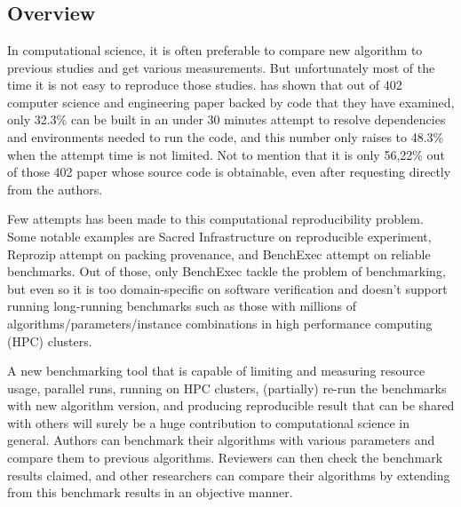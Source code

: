 \chapter{\babSatu}


\section{Overview}

In computational science, it is often preferable to compare new algorithm to previous studies and get various measurements. But unfortunately most of the time it is not easy to reproduce those studies. \cite{collbergRepeatabilityComputerSystems2016} has shown that out of 402 computer science and engineering paper backed by code that they have examined, only 32.3\% can be built in an under 30 minutes attempt to resolve dependencies and environments needed to run the code, and this number only raises to 48.3\% when the attempt time is not limited. Not to mention that it is only 56,22\% out of those 402 paper whose source code is obtainable, even after requesting directly from the authors.

Few attempts has been made to this computational reproducibility problem. Some notable examples are Sacred Infrastructure \citep{greffSacredInfrastructureComputational2017} on reproducible experiment, Reprozip \citep{chirigatiReproZipComputationalReproducibility2016} attempt on packing provenance, and BenchExec \citep{beyerReliableBenchmarkingRequirements2019} attempt on reliable benchmarks. Out of those, only BenchExec tackle the problem of benchmarking, but even so it is too domain-specific on software verification and doesn't support running long-running benchmarks such as those with millions of algorithms/parameters/instance combinations in high performance computing (HPC) clusters.

A new benchmarking tool that is capable of  limiting and measuring resource usage, parallel runs, running on HPC clusters, (partially) re-run the benchmarks with new algorithm version, and producing reproducible result that can be shared with others will surely be a huge contribution to computational science in general. Authors can benchmark their algorithms with various parameters and compare them to previous algorithms. Reviewers can then check the benchmark results claimed, and other researchers can compare their algorithms by extending from this benchmark results in an objective manner.

